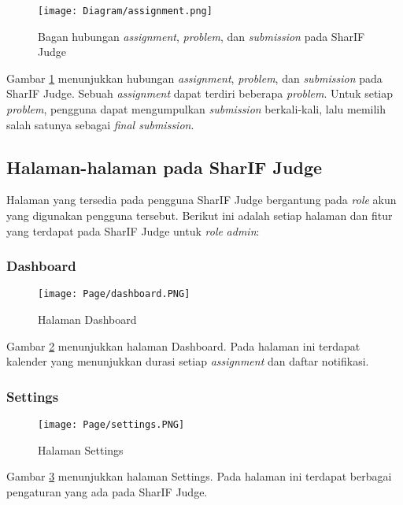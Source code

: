 \begin{figure}[H]
	\centering  
	\texttt{[image: Diagram/assignment.png]}  
	\caption{Bagan hubungan \textit{assignment}, \textit{problem}, dan \textit{submission} pada SharIF Judge}
	\label{fig:3:assignment} 
\end{figure} 

Gambar \ref{fig:3:assignment} menunjukkan hubungan \textit{assignment}, \textit{problem}, dan \textit{submission} pada SharIF Judge. Sebuah \textit{assignment} dapat terdiri beberapa \textit{problem}. Untuk setiap \textit{problem}, pengguna dapat mengumpulkan \textit{submission} berkali-kali, lalu memilih salah satunya sebagai \textit{final submission}.

\subsection{Halaman-halaman pada SharIF Judge}
\label{subs:3:fitur}

Halaman yang tersedia pada pengguna SharIF Judge bergantung pada \textit{role} akun yang digunakan pengguna tersebut. Berikut ini adalah setiap halaman dan fitur yang terdapat pada SharIF Judge untuk \textit{role} \textit{admin}:

\subsubsection{Dashboard}
    \begin{figure}[H]
    	\centering  
    	\texttt{[image: Page/dashboard.PNG]}  
    	\caption{Halaman Dashboard}
    	\label{fig:3:dashboard} 
    \end{figure} 
    
    Gambar \ref{fig:3:dashboard} menunjukkan halaman Dashboard. Pada halaman ini terdapat kalender yang menunjukkan durasi setiap \textit{assignment} dan daftar notifikasi.
    
\subsubsection{Settings}
    \begin{figure}[H]
    	\centering  
    	\texttt{[image: Page/settings.PNG]}  
    	\caption{Halaman Settings}
    	\label{fig:3:settings} 
    \end{figure} 
    
    Gambar \ref{fig:3:settings} menunjukkan halaman Settings. Pada halaman ini terdapat berbagai pengaturan yang ada pada SharIF Judge.
    

